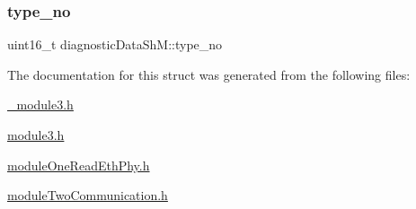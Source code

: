 \mbox{\label{structdiagnostic_data_sh_m_abaf7cabbe086caa5a4633769892634b8}} 
\subsubsection{\texorpdfstring{type\+\_\+no}{type\_no}\hspace{0.1cm}{\footnotesize\ttfamily [2/2]}}
{\footnotesize\ttfamily uint16\+\_\+t diagnostic\+Data\+Sh\+M\+::type\+\_\+no}



The documentation for this struct was generated from the following files\+:\begin{DoxyCompactItemize}
\item 
\mbox{\hyperlink{__module3_8h}{\+\_\+module3.\+h}}\item 
\mbox{\hyperlink{module3_8h}{module3.\+h}}\item 
\mbox{\hyperlink{module_one_read_eth_phy_8h}{module\+One\+Read\+Eth\+Phy.\+h}}\item 
\mbox{\hyperlink{module_two_communication_8h}{module\+Two\+Communication.\+h}}\end{DoxyCompactItemize}
